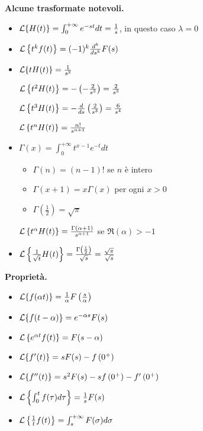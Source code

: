 \textbf{Alcune trasformate notevoli.}
\begin{itemize}
\item $\mathcal{L}\{H(t)\} = \int ^{ + \infty }_{0} e^{ - st} dt = \frac{1}{s}$, in questo caso $\lambda = 0$
\item $\mathcal{L}\left\{t^{k} f(t)\right\} = (- 1)^{k}\frac{d^{k}}{ds^{k}} F(s)$
\item $\mathcal{L}\{tH(t)\} = \frac{1}{s^{2}}$

$\mathcal{L}\left\{t^{2} H(t)\right\} = - \left(- \frac{2}{s^{3}}\right) = \frac{2}{s^{3}}$

$\mathcal{L}\left\{t^{3} H(t)\right\} = - \frac{d}{ds}\left(\frac{2}{s^{3}}\right) = \frac{6}{s^{4}}$

$\mathcal{L}\left\{t^{n} H(t)\right\} = \frac{n!}{s^{n + 1}}$
\item $\Gamma (x) = \int ^{ + \infty }_{0} t^{x - 1} e^{ - t} dt$
\begin{itemize}
\item $\Gamma (n) = (n - 1) !$ se $n$ è intero
\item $\Gamma (x + 1) = x\Gamma (x)$ per ogni $x > 0$
\item $\Gamma \left(\frac{1}{2}\right) = \sqrt{\pi }$
\end{itemize}

$\mathcal{L}\left\{t^{\alpha } H(t)\right\} = \frac{\Gamma (\alpha + 1)}{s^{\alpha + 1}}$ se $\Re (\alpha)  > - 1$
\item $\mathcal{L}\left\{\frac{1}{\sqrt{t}} H(t)\right\} = \frac{\Gamma \left(\frac{1}{2}\right)}{\sqrt{s}} = \frac{\sqrt{\pi }}{\sqrt{s}}$
\end{itemize}

\textbf{Proprietà.}
\begin{itemize}
\item $\mathcal{L}\{f(\alpha t)\} = \frac{1}{\alpha } F\left(\frac{s}{\alpha }\right)$
\item $\mathcal{L}\{f(t - \alpha)\} = e^{ - \alpha s} F(s)$
\item $\mathcal{L}\left\{e^{\alpha t} f(t)\right\} = F(s - \alpha)$
\item $\mathcal{L}\{f'(t)\} = sF(s) - f\left(0^{ + }\right)$
\item $\mathcal{L}\{f''(t)\} = s^{2} F(s) - sf\left(0^{ + }\right) - f'\left(0^{ + }\right)$
\item $\mathcal{L}\left\{\int ^{t}_{0} f(\tau) d\tau \right\} = \frac{1}{s} F(s)$
\item $\mathcal{L}\left\{\frac{1}{t} f(t)\right\} = \int ^{ + \infty }_{s} F(\sigma) d\sigma $
\end{itemize}

